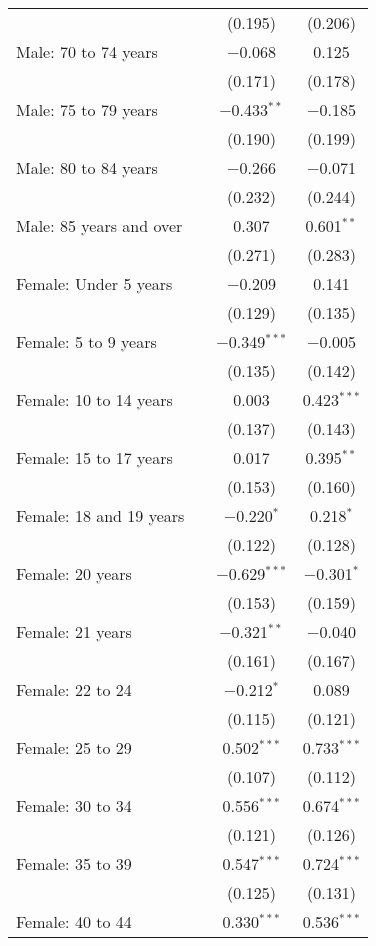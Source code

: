 \begin{longtable}{@{\extracolsep{5pt}}lccc}
  &  & (0.195) & (0.206) \\ 
  Male: 70 to 74 years &  & $-$0.068 & 0.125 \\ 
  &  & (0.171) & (0.178) \\ 
  Male: 75 to 79 years &  & $-$0.433$^{**}$ & $-$0.185 \\ 
  &  & (0.190) & (0.199) \\ 
  Male: 80 to 84 years &  & $-$0.266 & $-$0.071 \\ 
  &  & (0.232) & (0.244) \\ 
  Male: 85 years and over &  & 0.307 & 0.601$^{**}$ \\ 
  &  & (0.271) & (0.283) \\ 
  Female: Under 5 years &  & $-$0.209 & 0.141 \\ 
  &  & (0.129) & (0.135) \\ 
  Female: 5 to 9 years &  & $-$0.349$^{***}$ & $-$0.005 \\ 
  &  & (0.135) & (0.142) \\ 
  Female: 10 to 14 years &  & 0.003 & 0.423$^{***}$ \\ 
  &  & (0.137) & (0.143) \\ 
  Female: 15 to 17 years &  & 0.017 & 0.395$^{**}$ \\ 
  &  & (0.153) & (0.160) \\ 
  Female: 18 and 19 years &  & $-$0.220$^{*}$ & 0.218$^{*}$ \\ 
  &  & (0.122) & (0.128) \\ 
  Female: 20 years &  & $-$0.629$^{***}$ & $-$0.301$^{*}$ \\ 
  &  & (0.153) & (0.159) \\ 
  Female: 21 years &  & $-$0.321$^{**}$ & $-$0.040 \\ 
  &  & (0.161) & (0.167) \\ 
  Female: 22 to 24 &  & $-$0.212$^{*}$ & 0.089 \\ 
  &  & (0.115) & (0.121) \\ 
  Female: 25 to 29 &  & 0.502$^{***}$ & 0.733$^{***}$ \\ 
  &  & (0.107) & (0.112) \\ 
  Female: 30 to 34 &  & 0.556$^{***}$ & 0.674$^{***}$ \\ 
  &  & (0.121) & (0.126) \\ 
  Female: 35 to 39 &  & 0.547$^{***}$ & 0.724$^{***}$ \\ 
  &  & (0.125) & (0.131) \\ 
  Female: 40 to 44 &  & 0.330$^{***}$ & 0.536$^{***}$ \\ 

\end{longtable}
